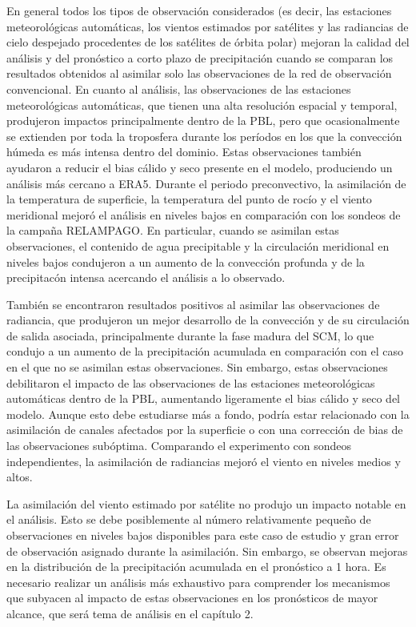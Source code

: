 \documentclass[12pt,oneside,a4paper]{reedthesis}
\begin{document}
En general todos los tipos de observación considerados (es decir, las estaciones meteorológicas automáticas, los vientos estimados por satélites y las radiancias de cielo despejado procedentes de los satélites de órbita polar) mejoran la calidad del análisis y del pronóstico a corto plazo de precipitación cuando se comparan los resultados obtenidos al asimilar solo las observaciones de la red de observación convencional. En cuanto al análisis, las observaciones de las estaciones meteorológicas automáticas, que tienen una alta resolución espacial y temporal, produjeron impactos principalmente dentro de la PBL, pero que ocasionalmente se extienden por toda la troposfera durante los períodos en los que la convección húmeda es más intensa dentro del dominio. Estas observaciones también ayudaron a reducir el bias cálido y seco presente en el modelo, produciendo un análisis más cercano a ERA5. Durante el periodo preconvectivo, la asimilación de la temperatura de superficie, la temperatura del punto de rocío y el viento meridional mejoró el análisis en niveles bajos en comparación con los sondeos de la campaña RELAMPAGO. En particular, cuando se asimilan estas observaciones, el contenido de agua precipitable y la circulación meridional en niveles bajos condujeron a un aumento de la convección profunda y de la precipitacón intensa acercando el análisis a lo observado.

También se encontraron resultados positivos al asimilar las observaciones de radiancia, que produjeron un mejor desarrollo de la convección y de su circulación de salida asociada, principalmente durante la fase madura del SCM, lo que condujo a un aumento de la precipitación acumulada en comparación con el caso en el que no se asimilan estas observaciones. Sin embargo, estas observaciones debilitaron el impacto de las observaciones de las estaciones meteorológicas automáticas dentro de la PBL, aumentando ligeramente el bias cálido y seco del modelo. Aunque esto debe estudiarse más a fondo, podría estar relacionado con la asimilación de canales afectados por la superficie o con una corrección de bias de las observaciones subóptima. Comparando el experimento con sondeos independientes, la asimilación de radiancias mejoró el viento en niveles medios y altos.

La asimilación del viento estimado por satélite no produjo un impacto notable en el análisis. Esto se debe posiblemente al número relativamente pequeño de observaciones en niveles bajos disponibles para este caso de estudio y gran error de observación asignado durante la asimilación. Sin embargo, se observan mejoras en la distribución de la precipitación acumulada en el pronóstico a 1 hora. Es necesario realizar un análisis más exhaustivo para comprender los mecanismos que subyacen al impacto de estas observaciones en los pronósticos de mayor alcance, que será tema de análisis en el capítulo 2.
\end{document}
